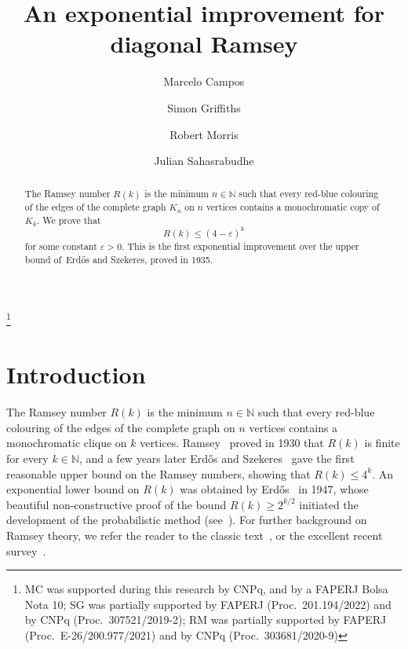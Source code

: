\documentclass[12pt,reqno]{amsart}
\theoremstyle{definition}
\theoremstyle{remark}
\newcommand\N{\mathbb{N}}
\newcommand\eps{\varepsilon}
\renewcommand{\le}{\leqslant}
\renewcommand{\ge}{\geqslant}
\def\eps{\varepsilon}
\def\N{\mathbb{N}}
\begin{document}
\title{An exponential improvement for diagonal Ramsey}

\author{Marcelo Campos \and Simon Griffiths \and Robert Morris \and Julian Sahasrabudhe}

\address{IMPA, Estrada Dona Castorina 110, Jardim Bot\^anico,
Rio de Janeiro, 22460-320, Brasil}

\address{Departamento de Matem\'atica, PUC-Rio, Rua Marqu\^{e}s de S\~{a}o Vicente 225, G\'avea, 22451-900 Rio de Janeiro, Brasil}

\address{IMPA, Estrada Dona Castorina 110, Jardim Bot\^anico,
Rio de Janeiro, 22460-320, Brasil}

\address{Department of Pure Mathematics and Mathematical Statistics, Wilberforce Road, Cambridge, CB3 0WA, UK}

\thanks{MC was supported during this research by CNPq, and by a FAPERJ Bolsa Nota 10; SG was partially supported by FAPERJ (Proc.~201.194/2022) and by CNPq (Proc.~307521/2019-2); RM was partially supported by FAPERJ (Proc.~E-26/200.977/2021) and by CNPq (Proc.~303681/2020-9)}

\begin{abstract}
The Ramsey number $R(k)$ is the minimum $n \in \N$ such that every red-blue colouring of the edges of the complete graph $K_n$ on $n$ vertices contains a monochromatic copy of $K_k$. We prove that 
$$R(k) \le (4 - \eps)^k$$ 
for some constant $\eps > 0$. This is the first exponential improvement over the upper bound of~Erd\H{o}s and Szekeres, proved in 1935. 
\end{abstract}

\maketitle

\section{Introduction}

The Ramsey number $R(k)$ is the minimum $n \in \N$ such that every red-blue colouring of the edges of the complete graph on $n$ vertices contains a monochromatic clique on $k$ vertices. Ramsey~\cite{R30} proved in 1930 that $R(k)$ is finite for every $k \in \N$, and a few years later Erd\H{o}s and Szekeres~\cite{ESz35} gave the first reasonable upper bound on the Ramsey numbers, showing that $R(k) \le 4^k$. An exponential lower bound on $R(k)$ was obtained by Erd\H{o}s~\cite{E47} in 1947, whose beautiful non-constructive proof of the bound $R(k) \ge 2^{k/2}$ initiated the development of the probabilistic method (see~\cite{AS}). For further background on Ramsey theory, we refer the reader to the classic text~\cite{GRS}, or the excellent recent survey~\cite{CFS}. 
\end{document}
